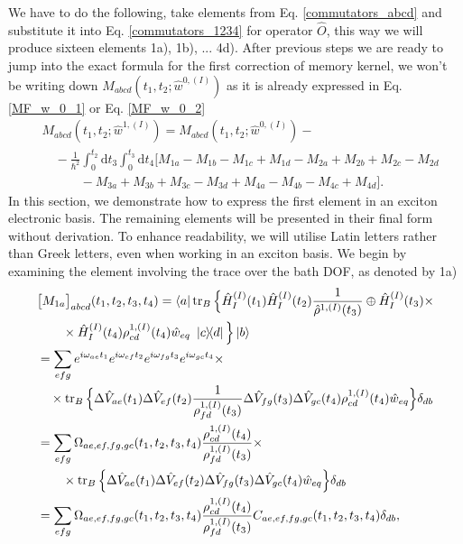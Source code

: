 We have to do the following, take elements from Eq. \ref{commutators_abcd} and substitute it into Eq. \ref{commutators_1234} for operator $\hat{O}$, this way we will produce sixteen elements 1a), 1b), ... 4d). After previous steps we are ready to jump into the exact formula for the first correction of memory kernel, we won't be writing down $M_{abcd}(t_1, t_2; \hat{w}^{0,(I)})$ as it is already expressed in Eq. \ref{MF_w_0_1} or Eq. \ref{MF_w_0_2}
\begin{equation}
\label{corrected_memory_kernel_decomposition}
    \begin{aligned}
    &M_{abcd}(t_1, t_2; \hat{w}^{1,(I)}) = M_{abcd}(t_1, t_2; \hat{w}^{0,(I)}) - \\
    &\quad -\frac{1}{\hbar^2} \int_{0}^{t_2} \mathrm{d} t_3 \int_{0}^{t_3} \mathrm{d} t_4 \Big[ M_{1a} - M_{1b} - M_{1c} + M_{1d} - M_{2a} + M_{2b} + M_{2c} - M_{2d}\\
    & \quad \quad \quad - M_{3a} + M_{3b} + M_{3c} - M_{3d} + M_{4a} - M_{4b} - M_{4c} + M_{4d}\Big].
    \end{aligned}
\end{equation}
In this section, we demonstrate how to express the first element in an exciton electronic basis. The remaining elements will be presented in their final form without derivation. To enhance readability, we will utilise Latin letters rather than Greek letters, even when working in an exciton basis. We begin by examining the element involving the trace over the bath DOF, as denoted by 1a)
\begin{equation}
\label{m_1a_rewriting_1}
    \begin{aligned}
    &\big[M_{1a}\big]_{abcd}(t_1, t_2, t_3, t_4) = \bra{a}\operatorname{tr}_B \Big\{ \hat{H}_{I}^{(I)}(t_1) \hat{H}_{I}^{(I)}(t_2) \frac{1}{\hat{\rho}^{1, (I)}(t_3)} \oplus \hat{H}_{I}^{(I)}(t_3) \times \\
    & \quad \quad  \times\hat{H}_{I}^{(I)}(t_4) \rho^{1, (I)}_{cd}(t_4)\hat{w}_{eq}\ \ketbra{c}{d}\Big\} \ket{b}  \\
    & = \sum_{efg} e^{i \omega_{ae}t_1} e^{i \omega_{ef}t_2} e^{i \omega_{fg}t_3} e^{i \omega_{gc}t_4} \times \\ 
    & \quad \times \operatorname{tr}_B \Big\{ \Delta\hat{V}_{ae}(t_1) \Delta\hat{V}_{ef}(t_2) \frac{1}{\rho^{1, (I)}_{fd}(t_3)} \Delta\hat{V}_{fg}(t_3) \Delta\hat{V}_{gc}(t_4) \rho^{1, (I)}_{cd}(t_4) \hat{w}_{eq} \Big\}  \delta_{db}\\
    & = \sum_{efg} \Omega_{ae,ef,fg,gc}(t_1,t_2,t_3,t_4)\frac{\rho^{1, (I)}_{cd}(t_4)}{\rho^{1, (I)}_{fd}(t_3)} \times \\ 
    & \quad \quad \times \operatorname{tr}_B \Big\{ \Delta\hat{V}_{ae}(t_1) \Delta\hat{V}_{ef}(t_2) \Delta\hat{V}_{fg}(t_3) \Delta\hat{V}_{gc}(t_4)  \hat{w}_{eq}\Big\} \delta_{db}\\
    & = \sum_{efg} \Omega_{ae,ef,fg,gc}(t_1,t_2,t_3,t_4)\frac{\rho^{1, (I)}_{cd}(t_4)}{\rho^{1, (I)}_{fd}(t_3)}  C_{ae,ef,fg,gc}(t_1, t_2, t_3, t_4) \delta_{db},
    \end{aligned} 
\end{equation}
